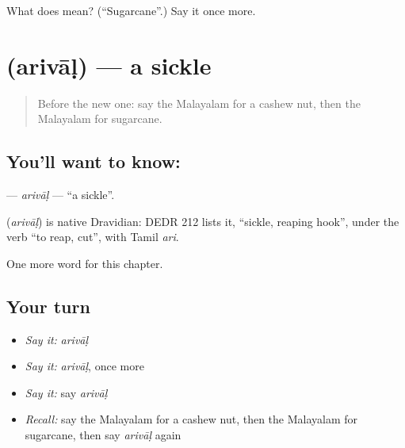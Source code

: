 \begin{tcolorbox}[breakable,colback=teal!4,colframe=teal!35!black,title={Before you move on}]
What does  mean? (\textquotedblleft{}Sugarcane\textquotedblright{}.) Say it once more.
\end{tcolorbox}
\section[\texorpdfstring{\ml{അരിവാൾ} (arivāḷ)}{അരിവാൾ (arivāḷ)}]{ (arivāḷ) — a sickle}

\label{lesson:ML-C333-arival}



\begin{quote}
Before the new one: say the Malayalam for a cashew nut, then the Malayalam for sugarcane.
\end{quote}

\subsection*{You'll want to know: }
\textbf{} — \emph{arivāḷ} — \textquotedblleft{}a sickle\textquotedblright{}.

\begin{cousinweb}
\textbf{} (\emph{arivāḷ}) is native Dravidian: DEDR 212 lists it, \textquotedblleft{}sickle, reaping hook\textquotedblright{}, under the verb \textquotedblleft{}to reap, cut\textquotedblright{}, with Tamil \emph{ari}.
\end{cousinweb}

\begin{grammarlens}[title={What you've built}]
One more word for this chapter.
\end{grammarlens}

\subsection*{Your turn}
\begin{itemize}
\raggedright
  \item \emph{Say it:} \emph{arivāḷ}
  \item \emph{Say it:} \emph{arivāḷ}, once more
  \item \emph{Say it:} say \emph{arivāḷ}
  \item \emph{Recall:} say the Malayalam for a cashew nut, then the Malayalam for sugarcane, then say \emph{arivāḷ} again
\end{itemize}

